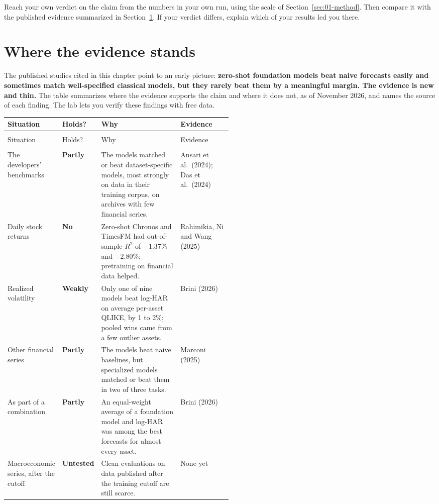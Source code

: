 Reach your own verdict on the claim from the numbers in your own run, using the scale of Section~\ref{sec:01-method}. Then compare it with the published evidence summarized in Section~\ref{sec:21-verdict}. If your verdict differs, explain which of your results led you there.

\section{Where the evidence stands}
\label{sec:21-verdict}

The published studies cited in this chapter point to an early picture: \textbf{zero-shot foundation models beat naive forecasts easily and sometimes match well-specified classical models, but they rarely beat them by a meaningful margin. The evidence is new and thin.} The table summarizes where the evidence supports the claim and where it does not, as of November 2026, and names the source of each finding. The lab lets you verify these findings with free data.

{\small
\begin{longtable}{@{}>{\raggedright\arraybackslash}p{0.19\linewidth}>{\raggedright\arraybackslash}p{0.10\linewidth}>{\raggedright\arraybackslash}p{}>{\raggedright\arraybackslash}p{0.23\linewidth}@{}}
\toprule
Situation & Holds? & Why & Evidence \\
\midrule
\endfirsthead
\multicolumn{4}{@{}l}{\emph{(continued)}} \\
\toprule
Situation & Holds? & Why & Evidence \\
\midrule
\endhead
\midrule
\multicolumn{4}{r@{}}{\emph{(continued on the next page)}} \\
\endfoot
\bottomrule
\endlastfoot
The developers' benchmarks & \textbf{Partly} & The models matched or beat dataset-specific models, most strongly on data in their training corpus, on archives with few financial series. & Ansari et al.\ (2024); Das et al.\ (2024) \\
\addlinespace[3pt]
Daily stock returns & \textbf{No} & Zero-shot Chronos and TimesFM had out-of-sample $R^2$ of $-1.37\%$ and $-2.80\%$; pretraining on financial data helped. & Rahimikia, Ni and Wang (2025) \\
\addlinespace[3pt]
Realized volatility & \textbf{Weakly} & Only one of nine models beat log-HAR on average per-asset QLIKE, by 1 to 2\%; pooled wins came from a few outlier assets. & Brini (2026) \\
\addlinespace[3pt]
Other financial series & \textbf{Partly} & The models beat naive baselines, but specialized models matched or beat them in two of three tasks. & Marconi (2025) \\
\addlinespace[3pt]
As part of a combination & \textbf{Partly} & An equal-weight average of a foundation model and log-HAR was among the best forecasts for almost every asset. & Brini (2026) \\
\addlinespace[3pt]
Macroeconomic series, after the cutoff & \textbf{Untested} & Clean evaluations on data published after the training cutoff are still scarce. & None yet \\
\end{longtable}
}

